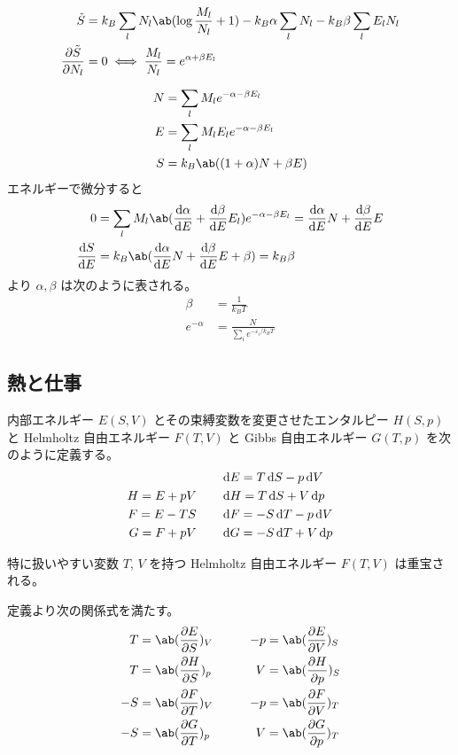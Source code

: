 \documentclass[uplatex,diffipdfmx,a4paper,11pt]{jlreq}
\numberwithin{equation}{section}
\theoremstyle{definition}
\begin{document}
\begin{align}
  \tilde{S}              & = k_B\sum_{l}N_l\ab(\log\frac{M_l}{N_l} + 1) - k_B\alpha\sum_{l}N_l - k_B\beta\sum_{l}E_lN_l \\
  \diffp{\tilde{S}}{N_l} & = 0 \iff \frac{M_l}{N_l} = e^{\alpha + \beta E_l}
\end{align}

\begin{align}
  N & = \sum_{l}M_le^{-\alpha-\beta E_l}    \\
  E & = \sum_{l}M_lE_le^{-\alpha-\beta E_l} \\
  S & = k_B\ab((1 + \alpha)N + \beta E)
\end{align}
エネルギーで微分すると
\begin{align}
  0           & = \sum_{l}M_l\ab(\diff{\alpha}{E} + \diff{\beta}{E}E_l)e^{-\alpha-\beta E_l} = \diff{\alpha}{E}N + \diff{\beta}{E}E \\
  \diff{S}{E} & = k_B\ab(\diff{\alpha}{E}N + \diff{\beta}{E}E + \beta) = k_B\beta
\end{align}
より $\alpha, \beta$ は次のように表される。
\begin{align}
  \beta       & = \frac{1}{k_BT}                            \\
  e^{-\alpha} & = \frac{N}{\sum_{i}e^{-\varepsilon_i/k_BT}}
\end{align}


\subsection{熱と仕事}
\begin{definition}
  内部エネルギー $E(S, V)$ とその束縛変数を変更させたエンタルピー $H(S, p)$ と Helmholtz 自由エネルギー $F(T, V)$ と Gibbs 自由エネルギー $G(T, p)$ を次のように定義する。
  \begin{align}
               & \qquad \dl{E} = T\dl{S} - p\dl{V}  \\
    H = E + pV & \qquad \dl{H} = T\dl{S} + V\dl{p}  \\
    F = E - TS & \qquad \dl{F} = -S\dl{T} - p\dl{V} \\
    G = F + pV & \qquad \dl{G} = -S\dl{T} + V\dl{p}
  \end{align}
\end{definition}
特に扱いやすい変数 $T$, $V$ を持つ Helmholtz 自由エネルギー $F(T, V)$ は重宝される。
\begin{theorem}
  定義より次の関係式を満たす。
  \begin{alignat}{3}
    T  & = \ab(\diffp{E}{S})_V & \qquad -p & = \ab(\diffp{E}{V})_S \\
    T  & = \ab(\diffp{H}{S})_p & \qquad V  & = \ab(\diffp{H}{p})_S \\
    -S & = \ab(\diffp{F}{T})_V & \qquad -p & = \ab(\diffp{F}{V})_T \\
    -S & = \ab(\diffp{G}{T})_p & \qquad V  & = \ab(\diffp{G}{p})_T
  \end{alignat}
\end{theorem}
\end{document}
